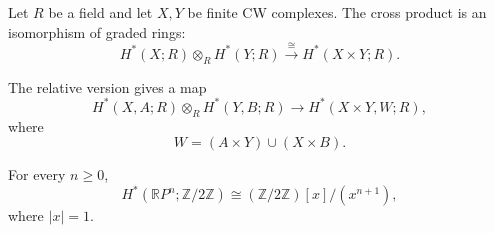 \begin{theorem}
\label{at-theorem-cohomology-kunneth}
Let $R$ be a field and let $X,Y$ be finite
CW complexes.  The cross product is an
isomorphism of graded rings:
$$
H^*(X;R)\otimes_RH^*(Y;R)
\xrightarrow{\cong}H^*(X\times Y;R).
$$
\end{theorem}

\noindent
The relative version gives a map
$$
H^*(X,A;R)\otimes_RH^*(Y,B;R)
\longrightarrow H^*(X\times Y,W;R),
$$
where
$$
W=(A\times Y)\cup(X\times B).
$$

\begin{proposition}
\label{at-proposition-projective-cup-ring}
For every $n\geq0$,
$$
H^*(\mathbb{R}P^n;
\mathbb{Z}/2\mathbb{Z})
\cong
(\mathbb{Z}/2\mathbb{Z})[x]/(x^{n+1}),
$$
where $|x|=1$.
\end{proposition}

